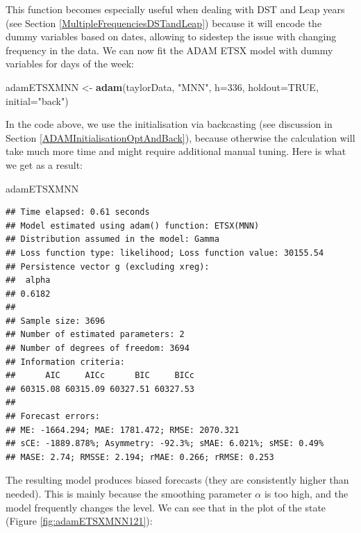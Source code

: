 \documentclass[]{book}
\newenvironment{Shaded}{\begin{snugshade}}{\end{snugshade}}
\newcommand{\DataTypeTok}[1]{\textcolor[rgb]{0.13,0.29,0.53}{#1}}
\newcommand{\DecValTok}[1]{\textcolor[rgb]{0.00,0.00,0.81}{#1}}
\newcommand{\KeywordTok}[1]{\textcolor[rgb]{0.13,0.29,0.53}{\textbf{#1}}}
\newcommand{\NormalTok}[1]{#1}
\newcommand{\OtherTok}[1]{\textcolor[rgb]{0.56,0.35,0.01}{#1}}
\newcommand{\StringTok}[1]{\textcolor[rgb]{0.31,0.60,0.02}{#1}}
\theoremstyle{definition}
\theoremstyle{definition}
\theoremstyle{definition}
\theoremstyle{definition}
\theoremstyle{remark}
\begin{document}
This function becomes especially useful when dealing with DST and Leap years (see Section \ref{MultipleFrequenciesDSTandLeap}) because it will encode the dummy variables based on dates, allowing to sidestep the issue with changing frequency in the data. We can now fit the ADAM ETSX model with dummy variables for days of the week:

\begin{Shaded}
\begin{Highlighting}[]
\NormalTok{adamETSXMNN <-}\StringTok{ }\KeywordTok{adam}\NormalTok{(taylorData, }\StringTok{"MNN"}\NormalTok{, }\DataTypeTok{h=}\DecValTok{336}\NormalTok{, }\DataTypeTok{holdout=}\OtherTok{TRUE}\NormalTok{,}
                    \DataTypeTok{initial=}\StringTok{"back"}\NormalTok{)}
\end{Highlighting}
\end{Shaded}

In the code above, we use the initialisation via backcasting (see discussion in Section \ref{ADAMInitialisationOptAndBack}), because otherwise the calculation will take much more time and might require additional manual tuning. Here is what we get as a result:

\begin{Shaded}
\begin{Highlighting}[]
\NormalTok{adamETSXMNN}
\end{Highlighting}
\end{Shaded}

\begin{verbatim}
## Time elapsed: 0.61 seconds
## Model estimated using adam() function: ETSX(MNN)
## Distribution assumed in the model: Gamma
## Loss function type: likelihood; Loss function value: 30155.54
## Persistence vector g (excluding xreg):
##  alpha 
## 0.6182 
## 
## Sample size: 3696
## Number of estimated parameters: 2
## Number of degrees of freedom: 3694
## Information criteria:
##      AIC     AICc      BIC     BICc 
## 60315.08 60315.09 60327.51 60327.53 
## 
## Forecast errors:
## ME: -1664.294; MAE: 1781.472; RMSE: 2070.321
## sCE: -1889.878%; Asymmetry: -92.3%; sMAE: 6.021%; sMSE: 0.49%
## MASE: 2.74; RMSSE: 2.194; rMAE: 0.266; rRMSE: 0.253
\end{verbatim}

The resulting model produces biased forecasts (they are consistently higher than needed). This is mainly because the smoothing parameter \(\alpha\) is too high, and the model frequently changes the level. We can see that in the plot of the state (Figure \ref{fig:adamETSXMNN121}):
\end{document}
